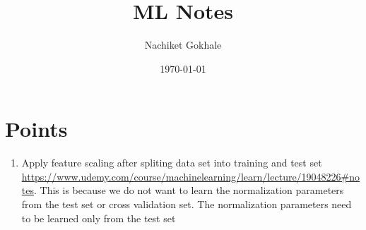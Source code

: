 \documentclass{article}
\begin{document}
\title{ML Notes}
\author{Nachiket Gokhale}
\date{\today}
\maketitle
\section{Points}
\begin{enumerate}
  \item{Apply feature scaling  after spliting data set into training and test set
   \url{https://www.udemy.com/course/machinelearning/learn/lecture/19048226#notes}. This is because we do not want to learn the normalization parameters from the test set or cross validation set. The normalization parameters need to be learned only from the test set}
\end{enumerate}
\end{document}
